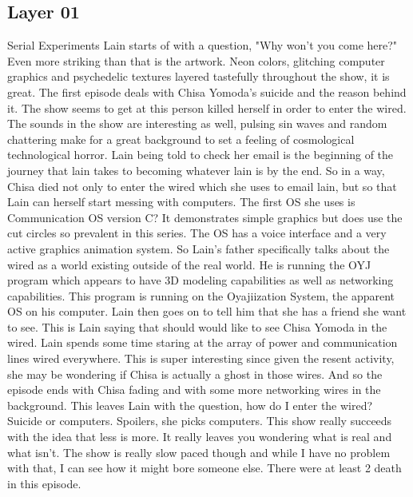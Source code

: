 \documentclass[12pt]{extarticle}
\theoremstyle{plain}
\theoremstyle{plain}
\theoremstyle{plain}
\theoremstyle{Definition}
\theoremstyle{Definition}
\theoremstyle{plain}
\theoremstyle{plain}
\begin{document}
		\subsection{Layer 01}
			Serial Experiments Lain starts of with a question, "Why won't you come here?"
			Even more striking than that is the artwork. Neon colors, glitching computer graphics and psychedelic textures layered tastefully throughout the show, it is great. The first episode deals with Chisa Yomoda's suicide and the reason behind it. The show seems to get at this person killed herself in order to enter the wired. The sounds in the show are interesting as well, pulsing sin waves and random chattering make for a great background to set a feeling of cosmological technological horror. Lain being told to check her email is the beginning of the journey that lain takes to becoming whatever lain is by the end. So in a way, Chisa died not only to enter the wired which she uses to email lain, but so that Lain can herself start messing with computers.  The first OS she uses is Communication OS version C? It demonstrates simple graphics but does use the cut circles so prevalent in this series. The OS has a voice interface and a very active graphics animation system. So Lain's father specifically talks about the wired as a world existing outside of the real world. He is running the OYJ program which appears to have 3D modeling capabilities as well as networking capabilities. This program is running on the Oyajiization System, the apparent OS on his computer. Lain then goes on to tell him that she has a friend she want to see. This is Lain saying that should would like to see Chisa Yomoda in the wired. Lain spends some time staring at the array of power and communication lines wired everywhere. This is super interesting since given the resent activity, she may be wondering if Chisa is actually a ghost in those wires. And so the episode ends with Chisa fading and with some more networking wires in the background. This leaves Lain with the question, how do I enter the wired? Suicide or computers. Spoilers, she picks computers. This show really succeeds with the idea that less is more. It really leaves you wondering what is real and what isn't. The show is really slow paced though and while I have no problem with that, I can see how it might bore someone else. There were at least 2 death in this episode. 
\end{document}
